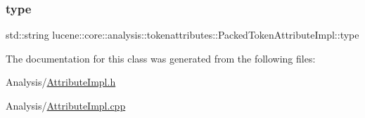 \subsubsection{\texorpdfstring{type}{type}}
{\footnotesize\ttfamily std\+::string lucene\+::core\+::analysis\+::tokenattributes\+::\+Packed\+Token\+Attribute\+Impl\+::type\hspace{0.3cm}{\ttfamily [private]}}



The documentation for this class was generated from the following files\+:\begin{DoxyCompactItemize}
\item 
Analysis/\mbox{\hyperlink{AttributeImpl_8h}{Attribute\+Impl.\+h}}\item 
Analysis/\mbox{\hyperlink{AttributeImpl_8cpp}{Attribute\+Impl.\+cpp}}\end{DoxyCompactItemize}
